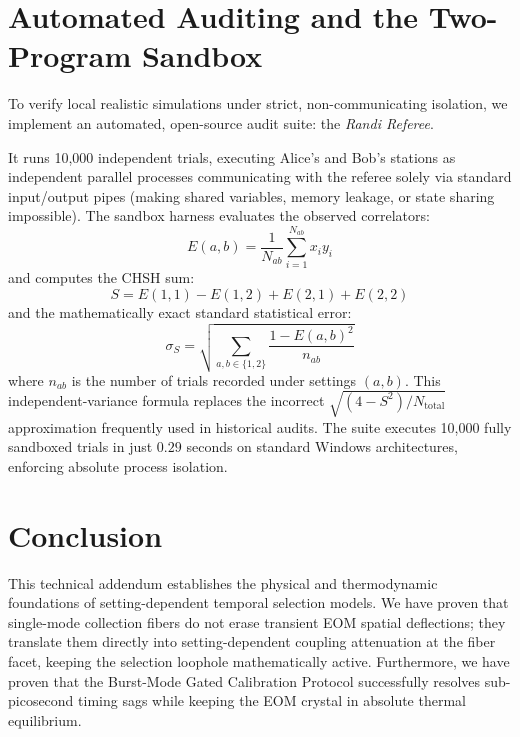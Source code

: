 \documentclass[11pt,twocolumn]{article}
\begin{document}
\section{Automated Auditing and the Two-Program Sandbox}
To verify local realistic simulations under strict, non-communicating isolation, we implement an automated, open-source audit suite: the \textit{Randi Referee}.

It runs 10,000 independent trials, executing Alice's and Bob's stations as independent parallel processes communicating with the referee solely via standard input/output pipes (making shared variables, memory leakage, or state sharing impossible). The sandbox harness evaluates the observed correlators:
\begin{equation}
E(a, b) = \frac{1}{N_{ab}} \sum_{i=1}^{N_{ab}} x_i y_i
\end{equation}
and computes the CHSH sum:
\begin{equation}
S = E(1,1) - E(1,2) + E(2,1) + E(2,2)
\end{equation}
and the mathematically exact standard statistical error:
\begin{equation}
\sigma_S = \sqrt{ \sum_{a,b \in \{1,2\}} \frac{1 - E(a,b)^2}{n_{ab}} }
\end{equation}
where $n_{ab}$ is the number of trials recorded under settings $(a,b)$. This independent-variance formula replaces the incorrect $\sqrt{(4-S^2)/N_{\text{total}}}$ approximation frequently used in historical audits. The suite executes 10,000 fully sandboxed trials in just $0.29$ seconds on standard Windows architectures, enforcing absolute process isolation.

\section{Conclusion}
This technical addendum establishes the physical and thermodynamic foundations of setting-dependent temporal selection models. We have proven that single-mode collection fibers do not erase transient EOM spatial deflections; they translate them directly into setting-dependent coupling attenuation at the fiber facet, keeping the selection loophole mathematically active. Furthermore, we have proven that the Burst-Mode Gated Calibration Protocol successfully resolves sub-picosecond timing sags while keeping the EOM crystal in absolute thermal equilibrium. 
\end{document}
